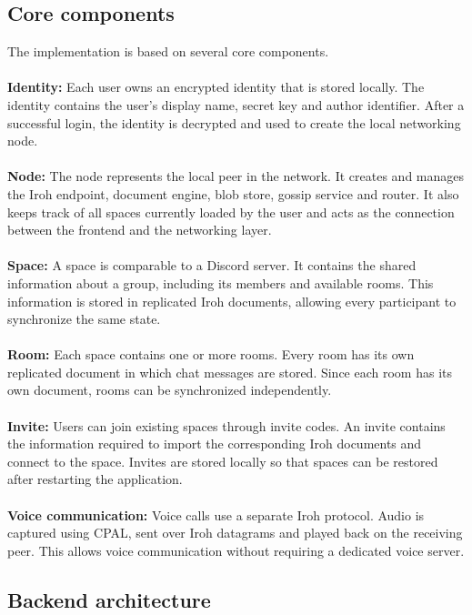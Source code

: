 \documentclass{article} %
\begin{document}
\subsection{Core components}
The implementation is based on several core components.
\\
\\
\textbf{Identity:}
Each user owns an encrypted identity that is stored locally. The identity contains the user's display name, secret key and author identifier. After a successful login, the identity is decrypted and used to create the local networking node.
\\
\\
\textbf{Node:}
The node represents the local peer in the network. It creates and manages the Iroh endpoint, document engine, blob store, gossip service and router. It also keeps track of all spaces currently loaded by the user and acts as the connection between the frontend and the networking layer.
\\
\\
\textbf{Space:}
A space is comparable to a Discord server. It contains the shared information about a group, including its members and available rooms. This information is stored in replicated Iroh documents, allowing every participant to synchronize the same state.
\\
\\
\textbf{Room:}
Each space contains one or more rooms. Every room has its own replicated document in which chat messages are stored. Since each room has its own document, rooms can be synchronized independently.
\\
\\
\textbf{Invite:}
Users can join existing spaces through invite codes. An invite contains the information required to import the corresponding Iroh documents and connect to the space. Invites are stored locally so that spaces can be restored after restarting the application.
\\
\\
\textbf{Voice communication:}
Voice calls use a separate Iroh protocol. Audio is captured using CPAL, sent over Iroh datagrams and played back on the receiving peer. This allows voice communication without requiring a dedicated voice server.

\subsection{Backend architecture}
\end{document}
